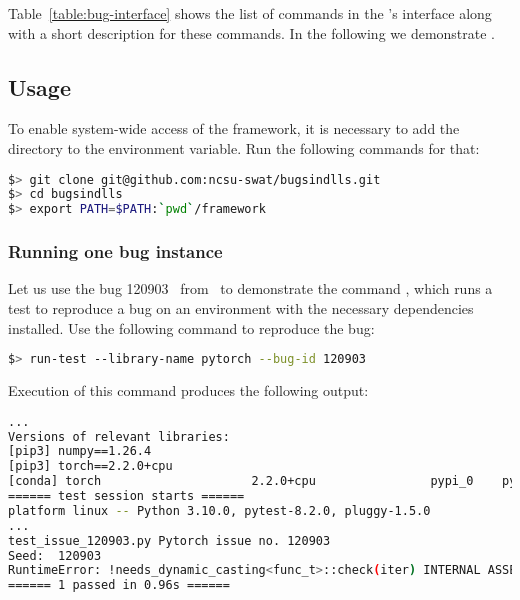 \documentclass[sigconf,screen]{acmart}
\begin{document}
Table~\ref{table:bug-interface} shows the list of commands in the
\tname's interface along with a short description for these
commands. In the following we demonstrate \tname.

\vspace{-1ex}
\subsection{Usage}
\label{sec:usage}

To enable system-wide access of the framework, it is necessary to add
the directory  to the  environment
variable. Run the following commands for that:

\begin{lstlisting}[language=bash,basicstyle=\small,]
$> git clone git@github.com:ncsu-swat/bugsindlls.git
$> cd bugsindlls
$> export PATH=$PATH:`pwd`/framework
\end{lstlisting}


\subsubsection{Running one bug instance}



Let us use the bug 120903~\cite{torch120903} from \torch\ to demonstrate the
command , which runs a test to reproduce a bug on an
environment with the necessary dependencies installed. Use the
following command to reproduce the bug:

\begin{lstlisting}[language=bash,basicstyle=\small,]
$> run-test --library-name pytorch --bug-id 120903
\end{lstlisting}

\noindent
Execution of this command produces the following output:

\begin{lstlisting}[language=bash,basicstyle=\small,]
... 
Versions of relevant libraries:
[pip3] numpy==1.26.4
[pip3] torch==2.2.0+cpu
[conda] torch                     2.2.0+cpu                pypi_0    pypi
====== test session starts ======
platform linux -- Python 3.10.0, pytest-8.2.0, pluggy-1.5.0
...
test_issue_120903.py Pytorch issue no. 120903
Seed:  120903
RuntimeError: !needs_dynamic_casting<func_t>::check(iter) INTERNAL ASSERT FAILED at "../aten/src/ATen/native/cpu/Loops.h":310, please report a bug to PyTorch. 
====== 1 passed in 0.96s ======
\end{lstlisting}
\end{document}
